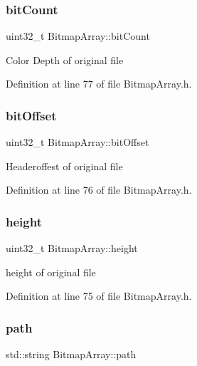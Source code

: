 \subsubsection{\texorpdfstring{bitCount}{bitCount}}
{\footnotesize\ttfamily uint32\+\_\+t Bitmap\+Array\+::bit\+Count\hspace{0.3cm}{\ttfamily [private]}}

Color Depth of original file 

Definition at line 77 of file Bitmap\+Array.\+h.

\mbox{\label{classBitmapArray_abcab200a1eb84331f7c79702e9199694}} 
\subsubsection{\texorpdfstring{bitOffset}{bitOffset}}
{\footnotesize\ttfamily uint32\+\_\+t Bitmap\+Array\+::bit\+Offset\hspace{0.3cm}{\ttfamily [private]}}

Headeroffest of original file 

Definition at line 76 of file Bitmap\+Array.\+h.

\mbox{\label{classBitmapArray_adb8d1a8fcc55c3884ad3eea71c6042be}} 
\subsubsection{\texorpdfstring{height}{height}}
{\footnotesize\ttfamily uint32\+\_\+t Bitmap\+Array\+::height\hspace{0.3cm}{\ttfamily [private]}}

height of original file 

Definition at line 75 of file Bitmap\+Array.\+h.

\mbox{\label{classBitmapArray_a3a3e1fbdd198c6731c7f6e20fb492445}} 
\subsubsection{\texorpdfstring{path}{path}}
{\footnotesize\ttfamily std\+::string Bitmap\+Array\+::path\hspace{0.3cm}{\ttfamily [private]}}

